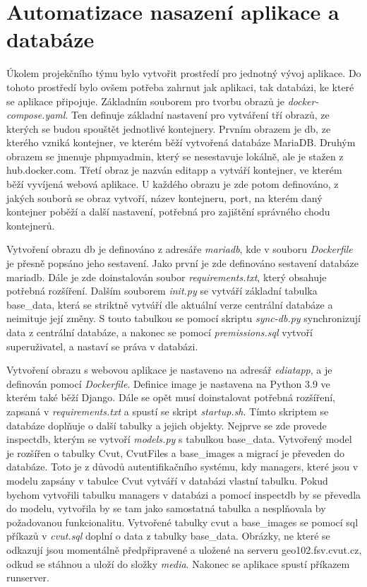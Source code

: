 \section{Automatizace nasazení aplikace a databáze}


Úkolem projekčního týmu bylo vytvořit prostředí pro jednotný vývoj aplikace. Do tohoto prostředí bylo ovšem potřeba zahrnut jak aplikaci, tak databázi, ke které se aplikace připojuje. Základním souborem pro tvorbu obrazů je \emph{docker-compose.yaml}. Ten definuje základní nastavení pro vytváření tří obrazů, ze kterých se budou spouštět jednotlivé kontejnery. Prvním obrazem je db, ze kterého vzniká kontejner, ve kterém běží vytvořená databáze MariaDB. Druhým obrazem se jmenuje phpmyadmin, který se nesestavuje lokálně, ale je stažen z hub.docker.com. Třetí obraz je nazván editapp a vytváří kontejner, ve kterém běží vyvíjená webová aplikace. U každého obrazu je zde potom definováno, z jakých souborů se obraz vytvoří, název kontejneru, port, na kterém daný kontejner poběží a další nastavení, potřebná pro zajištění správného chodu kontejnerů. 

Vytvoření obrazu db je definováno z adresáře \emph{mariadb}, kde v souboru \emph{Dockerfile} je přesně popsáno jeho sestavení. Jako první je zde definováno sestavení databáze mariadb. Dále je zde doinstalován soubor \emph{requirements.txt}, který obsahuje potřebná rozšíření. Dalším souborem \emph{init.py} se vytváří základní tabulka base\_data, která se striktně vytváří dle aktuální verze centrální databáze a neimituje její změny. S touto tabulkou se pomocí skriptu \emph{sync-db.py} synchronizují data z centrální databáze, a nakonec se pomocí \emph{premissions.sql} vytvoří superuživatel, a nastaví se práva v databázi. 

Vytvoření obrazu s webovou aplikace je nastaveno na adresář \emph{ediatapp}, a je definován pomocí \emph{Dockerfile}. Definice image je nastavena na Python 3.9 ve kterém také běží Django. Dále se opět musí doinstalovat potřebná rozšíření, zapsaná v \emph{requirements.txt} a spustí se skript \emph{startup.sh}. Tímto skriptem se databáze doplňuje o další tabulky a jejich objekty. Nejprve se zde provede inspectdb, kterým se vytvoří \emph{models.py} s tabulkou base\_data. Vytvořený model je rozšířen o tabulky Cvut, CvutFiles a base\_images a migrací je převeden do databáze. Toto je z důvodů autentifikačního systému, kdy managers, které jsou v modelu zapsány v tabulce Cvut vytváří v databázi vlastní tabulku. Pokud bychom vytvořili tabulku managers v databázi a pomocí inspectdb by se převedla do modelu, vytvořila by se tam jako samostatná tabulka a nesplňovala by požadovanou funkcionalitu. Vytvořené tabulky cvut a base\_images se pomocí sql příkazů v \emph{cvut.sql} doplní o data z tabulky base\_data. Obrázky, ne které se odkazují jsou momentálně předpřipravené a uložené na serveru geo102.fsv.cvut.cz, odkud se stáhnou a uloží do složky \emph{media}. Nakonec se aplikace spustí příkazem runserver. 

